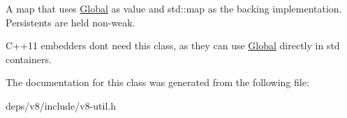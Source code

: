A map that uses \hyperlink{classv8_1_1_global}{Global} as value and std\+::map as the backing implementation. Persistents are held non-\/weak.

C++11 embedders don\textquotesingle{}t need this class, as they can use \hyperlink{classv8_1_1_global}{Global} directly in std containers. 

The documentation for this class was generated from the following file\+:\begin{DoxyCompactItemize}
\item 
deps/v8/include/v8-\/util.\+h\end{DoxyCompactItemize}
